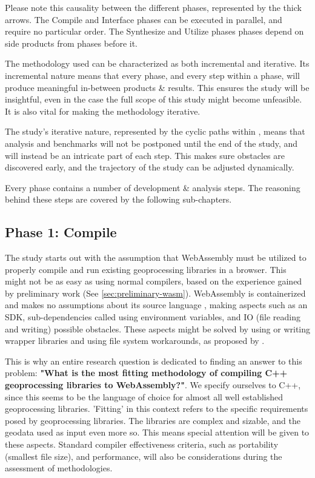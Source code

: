 Please note this causality between the different phases, represented by the thick arrows. The Compile and Interface phases can be executed in parallel, and require no particular order. The Synthesize and Utilize phases phases depend on side products from phases before it. 

The methodology used can be characterized as both incremental and iterative. Its incremental nature means that every phase, and every step within a phase, will produce meaningful in-between products \& results. This ensures the study will be insightful, even in the case the full scope of this study might become unfeasible. It is also vital for making the methodology iterative. 

The study's iterative nature, represented by the cyclic paths within , means that analysis and benchmarks will not be postponed until the end of the study, and will instead be an intricate part of each step. This makes sure obstacles are discovered early, and the trajectory of the study can be adjusted dynamically.  

Every phase contains a number of development \& analysis steps. The reasoning behind these steps are covered by the following sub-chapters.  


\subsection{Phase 1: Compile}

The study starts out with the assumption that WebAssembly must be utilized to properly compile and run existing geoprocessing libraries in a browser. This might not be as easy as using normal compilers, based on the experience gained by preliminary work (See \autoref{sec:preliminary-wasm}). WebAssembly is containerized and makes no assumptions about its source language \cite{haas_bringing_2017}, making aspects such as an SDK, sub-dependencies called using environment variables, and IO (file reading and writing) possible obstacles. These aspects might be solved by using or writing wrapper libraries and using file system workarounds, as proposed by \cite{jangda_not_2019}. 

This is why an entire research question is dedicated to finding an answer to this problem: \textbf{"What is the most fitting methodology of compiling C++ geoprocessing libraries to WebAssembly?"}.
We specify ourselves to C++, since this seems to be the language of choice for almost all well established geoprocessing libraries. 'Fitting' in this context refers to the specific requirements posed by geoprocessing libraries. The libraries are complex and sizable, and the geodata used as input even more so. This means special attention will be given to these aspects. Standard compiler effectiveness criteria, such as portability (smallest file size), and performance, will also be considerations during the assessment of methodologies.  

